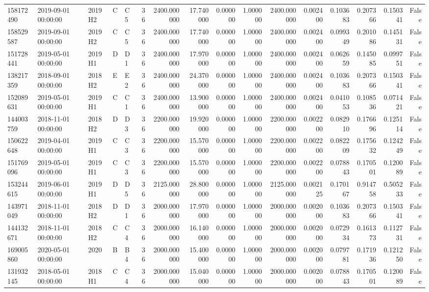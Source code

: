 \begin{tabular}{lllllrrrrrrrrrrr}
158172490 & 2019-09-01 00:00:00 & 2019H2 & C & C5 & 36 & 2400.000000 & 17.740000 & 0.000000 & 1.000000 & 2400.000000 & 0.002400 & 0.103683 & 0.207366 & 0.150341 & False \\
158529587 & 2019-09-01 00:00:00 & 2019H2 & C & C5 & 36 & 2400.000000 & 17.740000 & 0.000000 & 1.000000 & 2400.000000 & 0.002400 & 0.099349 & 0.201086 & 0.145131 & False \\
151728441 & 2019-05-01 00:00:00 & 2019H1 & D & D1 & 36 & 2400.000000 & 17.970000 & 0.000000 & 1.000000 & 2400.000000 & 0.002400 & 0.062659 & 0.145085 & 0.099751 & False \\
138217359 & 2018-09-01 00:00:00 & 2018H2 & E & E2 & 36 & 2400.000000 & 24.370000 & 0.000000 & 1.000000 & 2400.000000 & 0.002400 & 0.103683 & 0.207366 & 0.150341 & False \\
152089631 & 2019-05-01 00:00:00 & 2019H1 & C & C1 & 36 & 2400.000000 & 13.900000 & 0.000000 & 1.000000 & 2400.000000 & 0.002400 & 0.041053 & 0.108536 & 0.071421 & False \\
144003759 & 2018-11-01 00:00:00 & 2018H2 & D & D3 & 36 & 2200.000000 & 19.920000 & 0.000000 & 1.000000 & 2200.000000 & 0.002200 & 0.082910 & 0.176696 & 0.125114 & False \\
150622648 & 2019-04-01 00:00:00 & 2019H1 & C & C3 & 36 & 2200.000000 & 15.570000 & 0.000000 & 1.000000 & 2200.000000 & 0.002200 & 0.082209 & 0.175632 & 0.124249 & False \\
151769096 & 2019-05-01 00:00:00 & 2019H1 & C & C3 & 36 & 2200.000000 & 15.570000 & 0.000000 & 1.000000 & 2200.000000 & 0.002200 & 0.078843 & 0.170501 & 0.120089 & False \\
153244615 & 2019-06-01 00:00:00 & 2019H1 & D & D5 & 36 & 2125.000000 & 28.800000 & 0.000000 & 1.000000 & 2125.000000 & 0.002125 & 0.170167 & 0.914758 & 0.505233 & False \\
143971049 & 2018-11-01 00:00:00 & 2018H2 & D & D1 & 36 & 2000.000000 & 17.970000 & 0.000000 & 1.000000 & 2000.000000 & 0.002000 & 0.103683 & 0.207366 & 0.150341 & False \\
144132671 & 2018-11-01 00:00:00 & 2018H2 & C & C4 & 36 & 2000.000000 & 16.140000 & 0.000000 & 1.000000 & 2000.000000 & 0.002000 & 0.072934 & 0.161373 & 0.112731 & False \\
169005860 & 2020-05-01 00:00:00 & 2020 & B & B4 & 36 & 2000.000000 & 15.400000 & 0.000000 & 1.000000 & 2000.000000 & 0.002000 & 0.079781 & 0.171936 & 0.121250 & False \\
131932145 & 2018-05-01 00:00:00 & 2018H1 & C & C4 & 36 & 2000.000000 & 15.040000 & 0.000000 & 1.000000 & 2000.000000 & 0.002000 & 0.078843 & 0.170501 & 0.120089 & False \\

\end{tabular}

